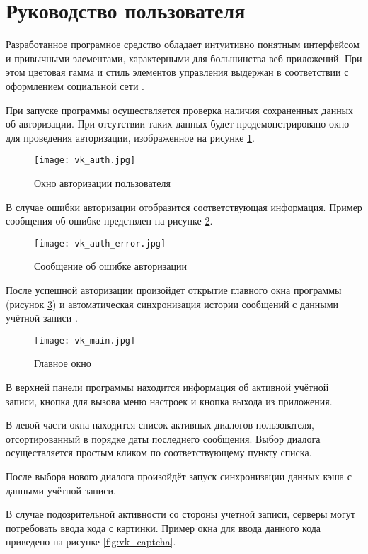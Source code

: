 \section{Руководство пользователя}

Разработанное програмное средство обладает интуитивно понятным интерфейсом и
привычными элементами, характерными для большинства веб-приложений. 
При этом цветовая гамма и стиль элементов управления выдержан в 
соответствии с оформлением социальной сети \vk{}.
 
При запуске программы осуществляется проверка наличия сохраненных данных об
авторизации. При отсутствии таких данных будет продемонстрировано окно
для проведения авторизации, изображенное на рисунке \ref{fig:vk_auth}.

\begin{figure}[h]
\centering
\texttt{[image: vk\_auth.jpg]}
\caption{Окно авторизации пользователя}
\label{fig:vk_auth}
\end{figure}

В случае ошибки авторизации отобразится соответствующая информация. Пример
сообщения об ошибке предствлен на рисунке \ref{fig:vk_auth_error}.

\begin{figure}[h!]
\centering
\texttt{[image: vk\_auth\_error.jpg]}
\caption{Сообщение об ошибке авторизации}
\label{fig:vk_auth_error}
\end{figure}

После успешной авторизации произойдет открытие главного окна программы (рисунок
\ref{fig:vk_main}) и автоматическая синхронизация истории сообщений с данными
учётной записи \vk{}.

\begin{figure}[h] \centering \texttt{[image: vk\_main.jpg]}
\caption{Главное окно \vkapp{}}
\label{fig:vk_main}
\end{figure}


В верхней панели программы находится информация об активной учётной записи,
кнопка для вызова меню настроек и кнопка выхода из приложения.

В левой части окна находится список активных диалогов пользователя,
отсортированный в порядке даты последнего сообщения. Выбор диалога
осуществляется простым кликом по соответствующему пункту списка.

После выбора нового диалога произойдёт запуск синхронизации данных кэша с
данными учётной записи.

В случае подозрительной активности со стороны учетной записи, серверы \vk могут
потребовать ввода кода с картинки. Пример окна для ввода данного кода приведено
на рисунке \ref{fig:vk_captcha}.

